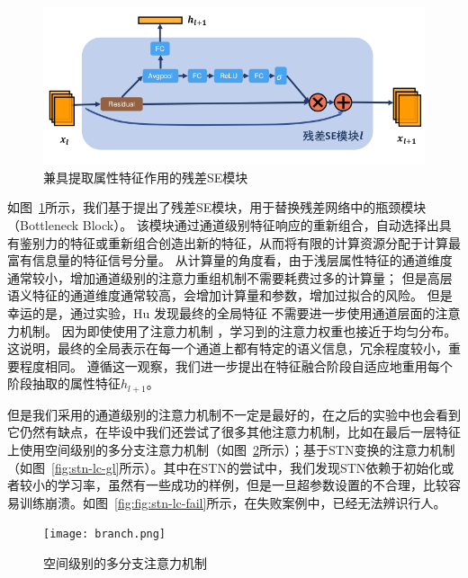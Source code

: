 \begin{figure}
	\centering
	\includegraphics[width=\textwidth]{fig/2018-05-11-16-53-10.png}
	\caption{兼具提取属性特征作用的残差SE模块}
	\label{fig:resse}
\end{figure}

如图~\ref{fig:resse}所示，我们基于\cite{hu2017senet}提出了残差SE模块，用于替换残差网络中的瓶颈模块（Bottleneck Block）。
该模块通过通道级别特征响应的重新组合，自动选择出具有鉴别力的特征或重新组合创造出新的特征，从而将有限的计算资源分配于计算最富有信息量的特征信号分量。
从计算量的角度看，由于浅层属性特征的通道维度通常较小，增加通道级别的注意力重组机制不需要耗费过多的计算量；
但是高层语义特征的通道维度通常较高，会增加计算量和参数，增加过拟合的风险。
但是幸运的是，通过实验，Hu \etal 发现最终的全局特征
不需要进一步使用通道层面的注意力机制。
因为即使使用了注意力机制
，学习到的注意力权重也接近于均匀分布。
这说明，最终的全局表示在每一个通道上都有特定的语义信息，冗余程度较小，重要程度相同。
遵循这一观察，我们进一步提出在特征融合阶段自适应地重用每个阶段抽取的属性特征$h_{l+1}$。

但是我们采用的通道级别的注意力机制不一定是最好的，在之后的实验中也会看到它仍然有缺点，在毕设中我们还尝试了很多其他注意力机制，比如在最后一层特征上使用空间级别的多分支注意力机制（如图~\ref{fig:branch}所示）；基于STN变换的注意力机制（如图~\ref{fig:stn-lc-gl}所示）。其中在STN的尝试中，我们发现STN依赖于初始化或者较小的学习率，虽然有一些成功的样例，但是一旦超参数设置的不合理，比较容易训练崩溃。如图~\ref{fig:fig:stn-lc-fail}所示，在失败案例中，已经无法辨识行人。
\begin{figure}
	\centering 
	\texttt{[image: branch.png]} 
	\caption{空间级别的多分支注意力机制} \label{fig:branch}
\end{figure}

